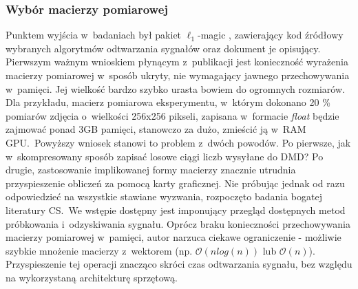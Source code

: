 \subsubsection{Wybór macierzy pomiarowej}
Punktem wyjścia w~badaniach był pakiet $\ell_1$-magic \cite{SinglePixelCameraCode}, zawierający kod źródłowy wybranych algorytmów odtwarzania sygnałów oraz dokument \cite{L1MagicNotes}  je opisujący. Pierwszym ważnym wnioskiem płynącym z~publikacji jest konieczność wyrażenia macierzy pomiarowej w~sposób ukryty, nie wymagający jawnego przechowywania w~pamięci. Jej wielkość bardzo szybko urasta bowiem do ogromnych rozmiarów. Dla przykładu, macierz pomiarowa eksperymentu, w~którym dokonano 20 \% pomiarów zdjęcia o~wielkości 256x256 pikseli, zapisana w~formacie \textit{float} będzie zajmować ponad 3GB pamięci, stanowczo za dużo, zmieścić ją w~RAM GPU.~Powyższy wniosek stanowi to problem z~dwóch powodów. Po pierwsze, jak w~skompresowany sposób zapisać losowe ciągi liczb wysyłane do DMD? Po drugie, zastosowanie implikowanej formy macierzy znacznie utrudnia przyspieszenie obliczeń za pomocą karty graficznej. Nie próbując jednak od razu odpowiedzieć na wszystkie stawiane wyzwania, rozpoczęto badania bogatej literatury CS.~We wstępie \cite{Fountoulakis2012} dostępny jest imponujący przegląd dostępnych metod próbkowania i~odzyskiwania sygnału. Oprócz braku konieczności przechowywania macierzy pomiarowej w~pamięci, autor narzuca ciekawe ograniczenie - możliwie szybkie mnożenie macierzy z~wektorem (np. $\mathcal{O}(nlog(n))$ lub $\mathcal{O}(n)$).  Przyspieszenie tej operacji znacząco skróci czas odtwarzania sygnału, bez względu na wykorzystaną architekturę sprzętową. 
\newline{}
